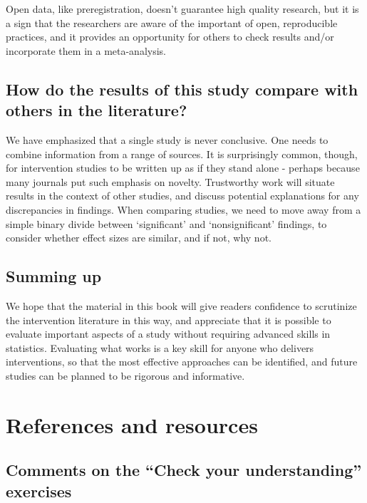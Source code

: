 \documentclass{krantz}
\begin{document}
Open data, like preregistration, doesn't guarantee high quality research, but it is a sign that the researchers are aware of the important of open, reproducible practices, and it provides an opportunity for others to check results and/or incorporate them in a meta-analysis.

\hypertarget{how-do-the-results-of-this-study-compare-with-others-in-the-literature}{%
\section{How do the results of this study compare with others in the literature?}\label{how-do-the-results-of-this-study-compare-with-others-in-the-literature}}

We have emphasized that a single study is never conclusive. One needs to combine information from a range of sources. It is surprisingly common, though, for intervention studies to be written up as if they stand alone - perhaps because many journals put such emphasis on novelty. Trustworthy work will situate results in the context of other studies, and discuss potential explanations for any discrepancies in findings. When comparing studies, we need to move away from a simple binary divide between `significant' and `nonsignificant' findings, to consider whether effect sizes are similar, and if not, why not.

\hypertarget{summing-up}{%
\section{Summing up}\label{summing-up}}

We hope that the material in this book will give readers confidence to scrutinize the intervention literature in this way, and appreciate that it is possible to evaluate important aspects of a study without requiring advanced skills in statistics. Evaluating what works is a key skill for anyone who delivers interventions, so that the most effective approaches can be identified, and future studies can be planned to be rigorous and informative.

\hypertarget{endmatter}{%
\chapter{References and resources}\label{endmatter}}

\hypertarget{comments-on-the-check-your-understanding-exercises}{%
\section{Comments on the ``Check your understanding'' exercises}\label{comments-on-the-check-your-understanding-exercises}}
\end{document}
